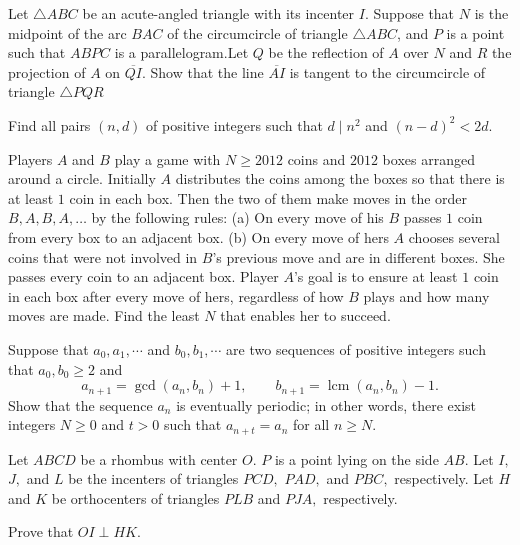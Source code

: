 \documentclass[11pt]{scrartcl}
\begin{document}
\begin{problem}[853206838493072]
Let $\triangle ABC$ be an acute-angled triangle with its incenter $I$. Suppose that $N$ is the midpoint of the arc $BAC$ of the circumcircle of triangle $\triangle ABC$, and $P$ is a point such that $ABPC$ is a parallelogram.Let $Q$ be the reflection of $A$ over $N$ and $R$ the projection of $A$ on $\overline{QI}$. Show that the line $\overline{AI}$ is tangent to the circumcircle of triangle $\triangle PQR$
\end{problem}
\begin{problem}[856916153770874]
	Find all pairs $(n,d)$ of positive integers such that $d\mid n^2$ and $(n-d)^2<2d$.
\end{problem}
\begin{problem}[857047923056144]
Players $A$ and $B$ play a game with $N \geq 2012$ coins and $2012$ boxes arranged around a circle. Initially $A$ distributes the coins among the boxes so that there is at least $1$ coin in each box. Then the two of them make moves in the order $B,A,B,A,\ldots $ by the following rules:
(a) On every move of his $B$ passes $1$ coin from every box to an adjacent box.
(b) On every move of hers $A$ chooses several coins that were not involved in $B$'s previous move and are in different boxes. She passes every coin to an adjacent box.
Player $A$'s goal is to ensure at least $1$ coin in each box after every move of hers, regardless of how $B$ plays and how many moves are made. Find the least $N$ that enables her to succeed.
\end{problem}
\begin{problem}[857386332886077]
Suppose that $a_0, a_1, \cdots $ and $b_0, b_1, \cdots$ are two sequences of positive integers such that $a_0, b_0 \ge 2$ and\[ a_{n+1} = \gcd{(a_n, b_n)} + 1, \qquad b_{n+1} = \operatorname{lcm}{(a_n, b_n)} - 1. \]Show that the sequence $a_n$ is eventually periodic; in other words, there exist integers $N \ge 0$ and $t > 0$ such that $a_{n+t} = a_n$ for all $n \ge N$.
\end{problem}
\begin{problem}[857598260795435]
Let $ ABCD $ be a rhombus with center $ O. $ $ P $ is a point lying on the side $ AB. $ Let $ I, $ $ J, $ and $ L $ be the incenters of triangles $ PCD, $ $ PAD, $ and $PBC, $ respectively. Let $ H $ and $ K $ be orthocenters of triangles $ PLB $ and $ PJA, $ respectively.

Prove that $ OI \perp HK. $
\end{problem}
\end{document}
